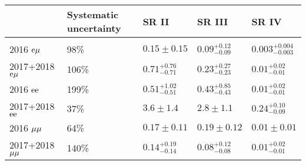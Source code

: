 \begin{table}[ht] 
\noindent \centering{}
\label{500umto10cm_estimates}
\begin{tabular}{lllll}
\hline
  & Systematic uncertainty & SR II & SR III & SR IV\\
  \hline\\[-2.4ex]
2016 $\mathrm{e}{\mu}$       & 98\%  & $0.15\pm0.15$           & $0.09^{+0.12}_{-0.09}$ & $0.003^{+0.004}_{-0.003}$\\[0.5ex]
2017+2018 $\mathrm{e}{\mu}$  & 106\% & $0.71^{+0.76}_{-0.71}$  & $0.23^{+0.27}_{-0.23}$ & $0.01^{+0.02}_{-0.01}$\\[0.5ex]
2016 $\mathrm{e}\mathrm{e}$        & 199\% & $0.51^{+1.02}_{-0.51}$  & $0.43^{+0.85}_{-0.43}$ & $0.01^{+0.02}_{-0.01}$\\[0.5ex]
2017+2018 $\mathrm{e}\mathrm{e}$   & 37\%  & $3.6\pm1.4$             & $2.8\pm1.1$            & $0.24^{+0.10}_{-0.09}$\\[0.5ex]
2016 ${\mu}{\mu}$      & 64\%  & $0.17\pm0.11$           & $0.19\pm0.12$          & $0.01\pm0.01$\\[0.5ex]
2017+2018 ${\mu}{\mu}$ & 140\% & $0.14^{+0.19}_{-0.14}$  & $0.08^{+0.12}_{-0.08}$ & $0.01^{+0.02}_{-0.01}$\\[0.5ex]
\hline
\end{tabular}
\end{table}